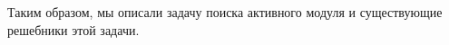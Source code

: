 %
%

\chapterconclusion
Таким образом, мы описали задачу поиска активного модуля и существующие решебники этой задачи.

